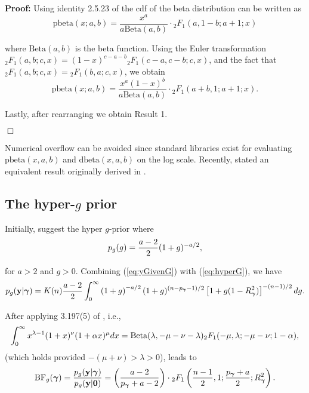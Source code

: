  
\noindent 
{\bf Proof:} Using identity 2.5.23 of \cite{Abramowitz1972} the cdf of the beta distribution
can be written as
\begin{equation*}
\mbox{pbeta}(x;a,b) = \frac{x^a}{a\mbox{Beta}(a,b)} \cdot {}_2F_1(a,1-b;a+1;x) 
\end{equation*}

\noindent where 
$\mbox{Beta}(a,b)$ is the beta function.
Using the Euler transformation
${}_2 F_1(a,b;c,x) = (1 - x)^{c-a-b} {}_2 F_1(c-a,c-b;c,x)$,
and the fact that ${}_2 F_1(a,b;c,x)={}_2 F_1(b,a;c,x)$,  we obtain
$$
\mbox{pbeta}(x;a,b) = \frac{x^a(1 - x)^{b}}{a\mbox{Beta}(a,b)} \cdot {}_2F_1(a+b,1;a+1;x). 
$$

\noindent Lastly, after rearranging we obtain Result 1.
\vspace{-0.5cm}\begin{flushright}$\Box$\end{flushright}

\noindent Numerical overflow can be avoided since standard libraries exist for
evaluating $\mbox{pbeta}(x,a,b)$ and $\mbox{dbeta}(x,a,b)$ on the log scale.
Recently, \cite{Nadarajah2015} stated an equivalent result originally derived
in \cite{PrudnikovEtal1986}. 

\subsection{The hyper-$g$ prior}

\noindent Initially, \cite{Liang2008} suggest the hyper $g$-prior where
\begin{equation}\label{eq:hyperG}
	\displaystyle p_{g}(g) = \frac{a - 2}{2}(1 + g)^{-a/2},
\end{equation}

\noindent for $a>2$ and $g>0$. Combining (\ref{eq:yGivenG}) with
(\ref{eq:hyperG}), we have
\begin{equation}\label{eq:hyperGmarginalIntegral}
	p_{g}({\bf y}|{\boldsymbol \gamma}) = K(n) \frac{a - 2}{2}  \int_0^\infty 
	\left( 1 + g \right)^{-a/2}
	(1 + g)^{(n-p_{\boldsymbol \gamma}-1)/2} \left[ 1 + g (1 - R_{\boldsymbol \gamma}^2) \right]^{-(n-1)/2}  dg.
\end{equation}

\noindent After applying 3.197(5) of \cite{Gradshteyn2007}, i.e.,
\begin{equation}\label{eq:31975}
	\displaystyle 
	\int_0^\infty x^{\lambda - 1}(1 + x)^\nu (1 + \alpha x)^\mu dx
	=\mbox{Beta}(\lambda,-\mu-\nu-\lambda){}_2F_1(-\mu,\lambda;-\mu-\nu; 1 - \alpha),
\end{equation}
\noindent (which holds provided $-(\mu  + \nu) > \lambda > 0$), leads to
\begin{equation}\label{eq:hyperGmarginal}
	\displaystyle \mbox{BF}_{g}({\boldsymbol \gamma}) = \frac{p_{g}({\bf y}|{\boldsymbol \gamma})}{p_{g}({\bf y}|{\bf 0})} =  \left( \frac{a - 2}{p_{\boldsymbol \gamma} + a - 2} \right) \cdot {}_2F_1\left( \frac{n-1}{2}, 1; \frac{p_{\boldsymbol \gamma} + a}{2}; R_{\boldsymbol \gamma}^2 \right).
\end{equation}

